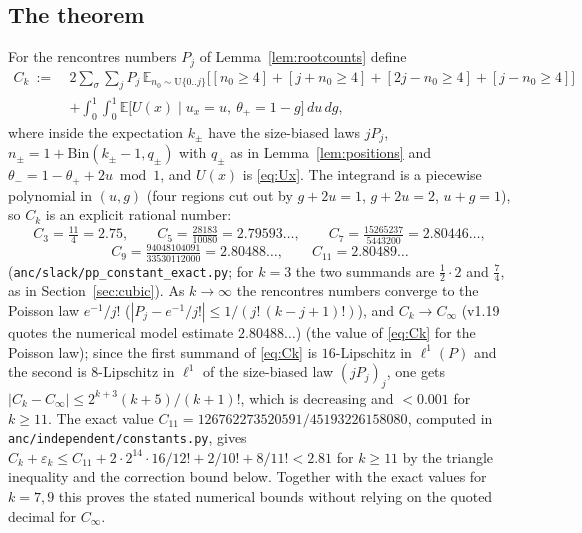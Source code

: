 \subsection*{The theorem}

For the rencontres numbers $P_j$ of Lemma~\ref{lem:rootcounts} define
\begin{equation}\label{eq:Ck}
\begin{aligned}
 C_k\ :=\ &2\sum_\sigma\sum_{j}P_j\,\mathbb E_{n_0\sim\mathrm U\{0..j\}}\bigl[[n_0\ge4]+[j+n_0\ge4]+[2j-n_0\ge4]+[j-n_0\ge4]\bigr]\\
 &+\int_0^1\!\!\int_0^1\mathbb E\bigl[U(x)\mid u_x=u,\ \theta_+=1-g\bigr]\,du\,dg ,
\end{aligned}
\end{equation}
where inside the expectation $k_\pm$ have the size-biased laws $jP_j$, $n_\pm=1+\mathrm{Bin}(k_\pm-1,q_\pm)$ with $q_\pm$ as in
Lemma~\ref{lem:positions} and $\theta_-=1-\theta_++2u\bmod1$, and $U(x)$ is \eqref{eq:Ux}.  The integrand is a piecewise polynomial in $(u,g)$ (four
regions cut out by $g+2u=1$, $g+2u=2$, $u+g=1$), so $C_k$ is an explicit rational number:
\[
 C_3=\tfrac{11}4=2.75,\qquad C_5=\tfrac{28183}{10080}=2.79593\ldots,\qquad C_7=\tfrac{15265237}{5443200}=2.80446\ldots,
\]
\[
 C_9=\tfrac{94048104091}{33530112000}=2.80488\ldots,\qquad C_{11}=2.80489\ldots
\]
(\texttt{anc/slack/pp\_constant\_exact.py}; for $k=3$ the two summands are $\tfrac12\cdot2$ and $\tfrac74$, as in Section~\ref{sec:cubic}).  As
$k\to\infty$ the rencontres numbers converge to the Poisson law $e^{-1}/j!$ ($|P_j-e^{-1}/j!|\le1/(j!\,(k-j+1)!)$), and $C_k\to C_\infty$ (v1.19 quotes the numerical model estimate $2.80488\ldots$)
(the value of \eqref{eq:Ck} for the Poisson law); since the first summand of \eqref{eq:Ck} is $16$-Lipschitz in $\ell^1(P)$ and the second is
$8$-Lipschitz in $\ell^1$ of the size-biased law $(jP_j)_j$, one gets $|C_k-C_\infty|\le2^{k+3}(k+5)/(k+1)!$, which is decreasing and $<0.001$ for $k\ge11$.
The exact value $C_{11}=126762273520591/45193226158080$, computed in \texttt{anc/independent/constants.py}, gives
$C_k+\varepsilon_k\le C_{11}+2\cdot2^{14}\cdot16/12!+2/10!+8/11!<2.81$ for $k\ge11$
by the triangle inequality and the correction bound below.
Together with the exact values for $k=7,9$ this proves the stated numerical bounds without relying on the quoted decimal for $C_\infty$.

